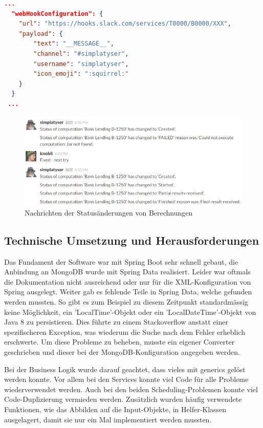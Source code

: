 \begin{lstlisting}[language=JSON, caption=Beispiel einer WebHook Konfiguration für Slack, label=lst:webhook_configuration]
  ...  
  "webHookConfiguration": {
    "url": "https://hooks.slack.com/services/T0000/B0000/XXX",
    "payload": {
        "text": "__MESSAGE__",
        "channel": "#simplatyser",
        "username": "simplatyser",
        "icon_emoji": ":squirrel:"
    }
  }
 ...
\end{lstlisting}

\begin{figure}[h]
\centering
\includegraphics[scale=0.8]{images/slack_chat.png}
\caption[Nachrichten der Statusänderungen von Berechnungen]{Nachrichten der Statusänderungen von Berechnungen \selfmade{}}
\label{fig:slack_chat}
\end{figure}

\subsection{Technische Umsetzung und Herausforderungen}
Das Fundament der Software war mit Spring Boot \cite{spring_boot} sehr schnell gebaut, die Anbindung an MongoDB wurde mit Spring Data \cite{spring_data} realisiert. Leider war 
oftmals die Dokumentation nicht ausreichend oder nur für die XML-Konfiguration von Spring ausgelegt. Weiter gab es fehlende Teile in Spring Data, welche gefunden werden mussten. 
So gibt es zum Beispiel zu diesem Zeitpunkt standardmässig keine Möglichkeit, ein 'LocalTime'-Objekt oder ein 'LocalDateTime'-Objekt von Java 8 zu persistieren. Dies führte zu einem 
Stackoverflow anstatt einer spezifischeren Exception, was wiederum die Suche nach dem Fehler erheblich erschwerte. Um diese Probleme zu beheben, musste ein eigener Converter 
geschrieben und dieser bei der MongoDB-Konfiguration angegeben werden.

Bei der Business Logik wurde darauf geachtet, dass vieles mit \gls{generics} gelöst werden konnte. Vor allem bei den Services konnte viel Code für alle Probleme wiederverwendet werden. Auch 
bei den beiden Scheduling-Problemen konnte viel Code-Duplizierung vermieden werden. Zusätzlich wurden häufig verwendete Funktionen, wie das Abbilden auf die Input-Objekte, in 
Helfer-Klassen ausgelagert, damit sie nur ein Mal implementiert werden mussten.


